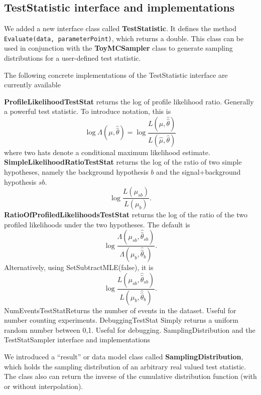 \documentclass[11pt]{article}
\begin{document}
	\subsection{TestStatistic interface and implementations}


We added a new interface class called \textbf{TestStatistic}. It defines the method \texttt{Evaluate(data, parameterPoint)}, which returns a double.  This class can be used in conjunction with the \textbf{ToyMCSampler} class to generate sampling distributions for a user-defined test statistic.  

The following concrete implementations of the TestStatistic interface are currently available

\textbf{ProfileLikelihoodTestStat} returns the log of profile likelihood ratio.  Generally a powerful test statistic. To introduce notation, this is
\[
  \log{
      \Lambda( \mu, \hat{\hat{\theta}} )
  }
  =
   \log{
     \frac{ L(\mu, \hat{\hat{ \theta }} )}
          { L(\hat{\mu}, \hat{\theta}) }
   }
\]
where two hats denote a conditional maximum likelihood estimate.
\textbf{SimpleLikelihoodRatioTestStat} returns the log of the ratio of two simple hypotheses, namely the background hypothesis $b$ and the signal+background hypothesis $sb$.
\[
  \log{
    \frac{ L(\mu_{sb}) }
         { L(\mu_{b}) }
  }.
\]
\textbf{RatioOfProfiledLikelihoodsTestStat} returns the log of the ratio of the two profiled likelihoods under the two hypotheses. The default is
\[
  \log{
    \frac{\Lambda(\mu_{sb} , \hat{\hat{ \theta }}_{sb}  )}
         {\Lambda(\mu_{b} , \hat{\hat{ \theta }}_{b}  )}
  }.
\]
Alternatively, using SetSubtractMLE(false), it is
\[
  \log{
    \frac{L(\mu_{sb} , \hat{\hat{ \theta }}_{sb}  )}
         {L(\mu_{b} , \hat{\hat{ \theta }}_{b}  )}
  }.
\]
NumEventsTestStatReturns the number of events in the dataset.  Useful for number counting experiments.
DebuggingTestStat Simply returns a uniform random number between 0,1.  Useful for debugging.
SamplingDistribution and the TestStatSampler interface and implementations

We introduced a ``result'' or data model class called \textbf{SamplingDistribution}, which holds the sampling distribution of an arbitrary real valued test statistic.  The class also can return the inverse of the cumulative distribution function (with or without interpolation).  
\end{document}
